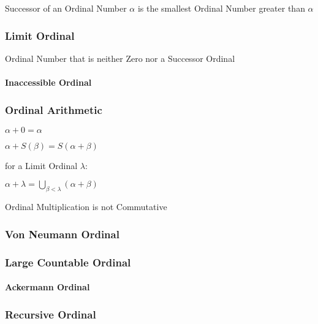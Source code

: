 Successor of an Ordinal Number $\alpha$ is the smallest Ordinal Number
greater than $\alpha$



\subsubsection{Limit Ordinal}\label{sec:limit_ordinal}

Ordinal Number that is neither Zero nor a Successor Ordinal



\paragraph{Inaccessible Ordinal}\label{sec:inaccessible_ordinal}\hfill



\subsubsection{Ordinal Arithmetic}\label{sec:ordinal_arithmetic}

$\alpha + 0 = \alpha$

$\alpha + S(\beta) = S(\alpha + \beta)$

for a Limit Ordinal $\lambda$:

$\alpha + \lambda = \bigcup_{\beta < \lambda} (\alpha + \beta)$

Ordinal Multiplication is not Commutative



\subsubsection{Von Neumann Ordinal}\label{sec:vonneumann_ordinal}

\subsubsection{Large Countable Ordinal}\label{sec:large_countable}

\paragraph{Ackermann Ordinal}\label{sec:ackermann_ordinal}\hfill



\subsubsection{Recursive Ordinal}\label{sec:recursive_ordinal}

